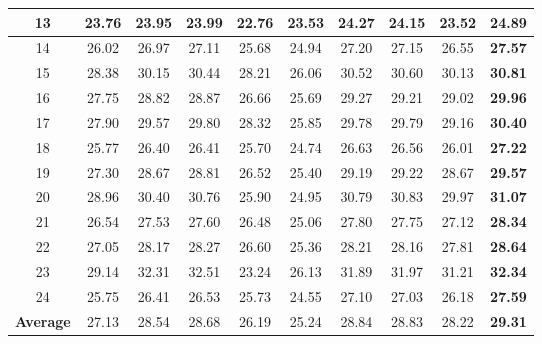 \documentclass[10pt,twocolumn,letterpaper,sort&compress]{article}
\begin{document}
\begin{table}
\begin{center}
\begin{tabular}{|c||c|c|c|c|c|c|c|c|c|}
\hline
13 & 23.76 & 23.95 & 23.99 & 22.76 & 23.53 & 24.27 & 24.15 & 23.52 & \textbf{24.89}
\\
\hline
14 & 26.02 & 26.97 & 27.11 & 25.68 & 24.94 & 27.20 & 27.15 & 26.55 & \textbf{27.57}
\\
\hline
15 & 28.38 & 30.15 & 30.44 & 28.21 & 26.06 & 30.52 & 30.60 & 30.13 & \textbf{30.81}
\\
\hline
16 & 27.75 & 28.82 & 28.87 & 26.66 & 25.69 & 29.27 & 29.21 & 29.02 & \textbf{29.96}
\\
\hline
17 & 27.90 & 29.57 & 29.80 & 28.32 & 25.85 & 29.78 & 29.79 & 29.16 & \textbf{30.40}
\\
\hline
18 & 25.77 & 26.40 & 26.41 & 25.70 & 24.74 & 26.63 & 26.56 & 26.01 & \textbf{27.22}
\\
\hline
19 & 27.30 & 28.67 & 28.81 & 26.52 & 25.40 & 29.19 & 29.22 & 28.67 & \textbf{29.57}
\\
\hline
20 & 28.96 & 30.40 & 30.76 & 25.90 & 24.95 & 30.79 & 30.83 & 29.97 & \textbf{31.07}
\\
\hline
21 & 26.54 & 27.53 & 27.60 & 26.48 & 25.06 & 27.80 & 27.75 & 27.12 & \textbf{28.34}
\\
\hline
22 & 27.05 & 28.17 & 28.27 & 26.60 & 25.36 & 28.21 & 28.16 & 27.81 & \textbf{28.64}
\\
\hline
23 & 29.14 & 32.31 & 32.51 & 23.24 & 26.13 & 31.89 & 31.97 & 31.21 & \textbf{32.34}
\\
\hline
24 & 25.75 & 26.41 & 26.53 & 25.73 & 24.55 & 27.10 & 27.03 & 26.18 & \textbf{27.59}
\\
\hline
\textbf{Average} & 27.13 & 28.54 & 28.68 & 26.19 & 25.24 & 28.84 & 28.83 & 28.22 & \textbf{29.31}
\\
\hline
\end{tabular}
\end{center}
\end{table}
\end{document}
